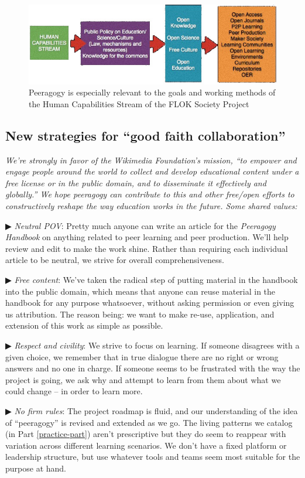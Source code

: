 \begin{figure}
\includegraphics[width=\textwidth]{../pictures/flok2.jpg}
\caption*{Peeragogy is especially relevant to the goals and working methods of the Human Capabilities Stream of the FLOK Society Project}
\end{figure}

\clearpage

\begin{mdframed}
\label{good-faith-collaboration}
\subsection{New strategies for ``good faith collaboration''}

\noindent \emph{We're strongly in favor of the Wikimedia
  Foundation's mission, ``to empower and engage people around the
  world to collect and develop educational content under a free
  license or in the public domain, and to disseminate it effectively
  and globally.''  We hope peeragogy can contribute to this and
  other free/open efforts to constructively reshape the way education
  works in the future.  Some shared values:}

▶ \emph{Neutral POV}: Pretty much anyone can write an article for the
\emph{Peeragogy Handbook} on anything related to peer learning and
peer production.  We'll help review and edit to make the work shine.
Rather than requiring each individual article to be neutral, we strive
for overall comprehensiveness.

▶ \emph{Free content}: We've taken the radical step of putting
material in the handbook into the public domain, which means that
anyone can reuse material in the handbook for any purpose whatsoever,
without asking permission or even giving us attribution.  The reason
being: we want to make re-use, application, and extension of this work
as simple as possible.

▶ \emph{Respect and civility}: We strive to focus on learning.  If
someone disagrees with a given choice, we remember that in true
dialogue there are no right or wrong answers and no one in charge.  If
someone seems to be frustrated with the way the project is going, we
ask why and attempt to learn from them about what we could change --
in order to learn more.

▶ \emph{No firm rules}: The project roadmap is fluid, and our
understanding of the idea of ``peeragogy'' is revised and extended as
we go.  The living patterns we catalog (in Part \ref{practice-part})
aren't prescriptive but they do seem to reappear with variation across
different learning scenarios.  We don't have a fixed platform or
leadership structure, but use whatever tools and teams seem most
suitable for the purpose at hand.
\end{mdframed}
